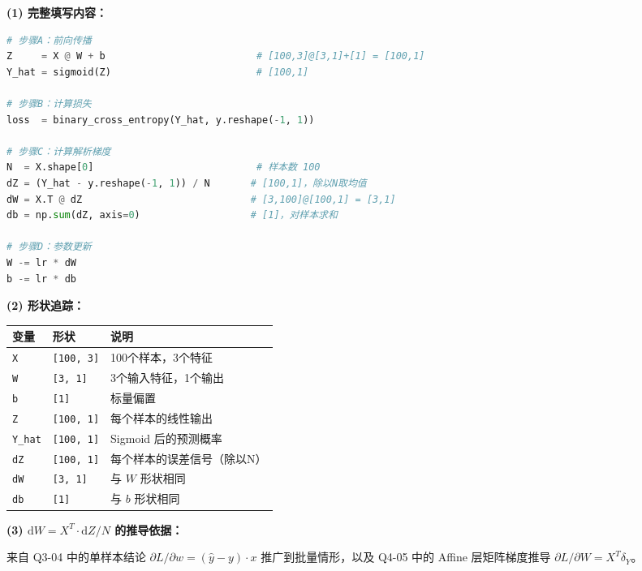 \documentclass[a4paper,11pt]{ctexart}
\begin{document}
\begin{solutionbox}[参考答案与详细解析]
    \textbf{(1) 完整填写内容：}

    \begin{lstlisting}[language=Python]
# 步骤A：前向传播
Z     = X @ W + b                          # [100,3]@[3,1]+[1] = [100,1]
Y_hat = sigmoid(Z)                         # [100,1]

# 步骤B：计算损失
loss  = binary_cross_entropy(Y_hat, y.reshape(-1, 1))

# 步骤C：计算解析梯度
N  = X.shape[0]                            # 样本数 100
dZ = (Y_hat - y.reshape(-1, 1)) / N       # [100,1]，除以N取均值
dW = X.T @ dZ                             # [3,100]@[100,1] = [3,1]
db = np.sum(dZ, axis=0)                   # [1]，对样本求和

# 步骤D：参数更新
W -= lr * dW
b -= lr * db
    \end{lstlisting}

    \textbf{(2) 形状追踪：}

    \begin{center}
    \begin{tabular}{lll}
        \toprule
        变量 & 形状 & 说明 \\
        \midrule
        \texttt{X} & \texttt{[100, 3]} & 100个样本，3个特征 \\
        \texttt{W} & \texttt{[3, 1]} & 3个输入特征，1个输出 \\
        \texttt{b} & \texttt{[1]} & 标量偏置 \\
        \texttt{Z} & \texttt{[100, 1]} & 每个样本的线性输出 \\
        \texttt{Y\_hat} & \texttt{[100, 1]} & Sigmoid 后的预测概率 \\
        \texttt{dZ} & \texttt{[100, 1]} & 每个样本的误差信号（除以N） \\
        \texttt{dW} & \texttt{[3, 1]} & 与 $W$ 形状相同 \\
        \texttt{db} & \texttt{[1]} & 与 $b$ 形状相同 \\
        \bottomrule
    \end{tabular}
    \end{center}

    \textbf{(3) $\mathrm{d}W = X^T \cdot \mathrm{d}Z / N$ 的推导依据：}

    来自 Q3-04 中的单样本结论 $\partial L/\partial w = (\hat{y}-y)\cdot x$ 推广到批量情形，以及 Q4-05 中的 Affine 层矩阵梯度推导 $\partial L/\partial W = X^T \delta_Y$。


\end{solutionbox}
\end{document}
